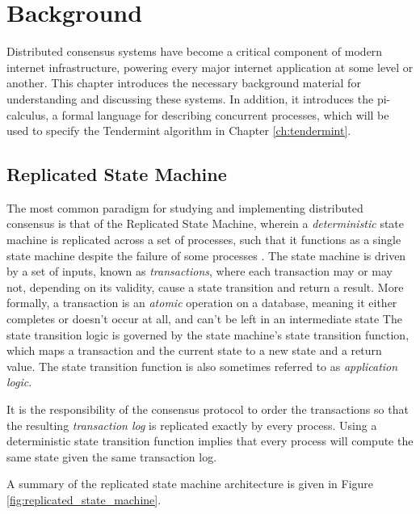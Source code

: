 \chapter{Background}
\label{ch:background}

Distributed consensus systems have become a critical component of modern internet infrastructure, 
powering every major internet application at some level or another.
This chapter introduces the necessary background material for understanding and discussing these systems.
In addition, it introduces the pi-calculus, a formal language for describing concurrent processes,
which will be used to specify the Tendermint algorithm in Chapter \ref{ch:tendermint}.

\section{Replicated State Machine}

The most common paradigm for studying and implementing distributed consensus is that of the Replicated State Machine, 
wherein a \emph{deterministic} state machine is replicated across a set of processes, 
such that it functions as a single state machine despite the failure of some processes \cite{state_machine}.
The state machine is driven by a set of inputs, known as \emph{transactions}, 
where each transaction may or may not, depending on its validity, cause a state transition and return a result.
More formally, a transaction is an \emph{atomic} operation on a database, 
meaning it either completes or doesn't occur at all, 
and can't be left in an intermediate state \cite{transactions}
The state transition logic is governed by the state machine's state transition function,
which maps a transaction and the current state to a new state and a return value.
The state transition function is also sometimes referred to as \emph{application logic}.

It is the responsibility of the consensus protocol to order the transactions so that the resulting 
\emph{transaction log} is replicated exactly by every process.
Using a deterministic state transition function implies that 
every process will compute the same state given the same transaction log.

A summary of the replicated state machine architecture is given in Figure \ref{fig:replicated_state_machine}.

